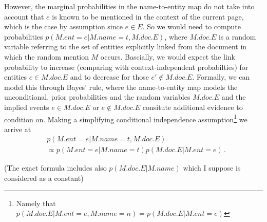 \documentclass{article}
\begin{document}
However, the marginal probabilities in the name-to-entity map do not take into account that $e$ is known to be mentioned in the context of the current page, which is the case by assumption since $e \in E$. So we would need to compute probabilities $p(M.ent =e | M.name=t, M.doc.E)$, where $M.doc.E$ is a random variable referring to the set of entities explicitly linked from the document in which the random mention $M$ occurs. Bascially, we would expect the link probability to increase {\color{blue} (comparing with context-independent probabilties)} for entities $e \in M.doc.E$ and to decrease for those $e' \not\in M.doc.E$. Formally, we can model this through Bayes' rule, where the name-to-entity map models the unconditional, prior probabilities and the random variables $M.doc.E$ and the implied events $e \in M.doc.E$ or $e \not\in M.doc.E$ consitute additional evidence to condition on. Making a simplifying conditional independence assumption\footnote{Namely that  $ p(M.doc.E | M.ent=e, M.name=n) =  p(M.doc.E | M.ent=e)$} we arrive at 
\begin{align}
& p(M.ent =e | M.name=t, M.doc.E)  \\
& \propto  p(M.ent =e | M.name=t) p(M.doc.E | M.ent=e) \,. \nonumber
\end{align}

{\color{blue} (The exact formula includes also $p(M.doc.E | M.name)$ which I suppose is considered as a constant)}
\end{document}
